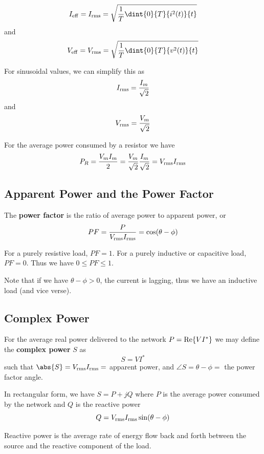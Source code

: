 \documentclass[12pt]{article}
\begin{document}
\[ I_{{\rm eff}} = I_{{\rm rms}} = \sqrt{\frac{1}{T}\dint{0}{T}{i^2(t)}{t}} \] and \[ V_{{\rm eff}} = V_{{\rm rms}} = \sqrt{\frac{1}{T}\dint{0}{T}{v^2(t)}{t}} \]

For sinusoidal values, we can simplify this as \[ I_{{\rm rms}} = \frac{I_m}{\sqrt{2}} \] and \[ V_{{\rm rms}} = \frac{V_m}{\sqrt{2}} \]

For the average power consumed by a resistor we have \[ P_R = \frac{V_mI_m}{2} = \frac{V_m}{\sqrt{2}}\frac{I_m}{\sqrt{2}} = V_{{\rm rms}}I_{{\rm rms}} \]

\subsection*{Apparent Power and the Power Factor}
The {\bf power factor} is the ratio of average power to apparent power, or \[ PF = \frac{P}{V_{{\rm rms}}I_{{\rm rms}}} = \cos(\theta - \phi) \]

For a purely resistive load, $PF = 1$. For a purely inductive or capacitive load, $PF = 0$. Thus we have $0 \leq PF \leq 1$.

Note that if we have $\theta - \phi > 0$, the current is lagging, thus we have an inductive load (and vice verse).

\subsection*{Complex Power}
For the average real power delivered to the network $P = {\rm Re}\{VI^*\}$ we may define the {\bf complex power} $S$ as \[ S = VI^* \] such that $\abs{S} = V_{{\rm rms}}I_{{\rm rms}} =$ apparent power, and $\angle S = \theta - \phi =$ the power factor angle.

In rectangular form, we have $S = P + jQ$ where $P$ is the average power consumed by the network and $Q$ is the reactive power \[ Q = V_{{\rm rms}}I_{{\rm rms}}\sin(\theta - \phi) \]

Reactive power is the average rate of energy flow back and forth between the source and the reactive component of the load.
\end{document}
